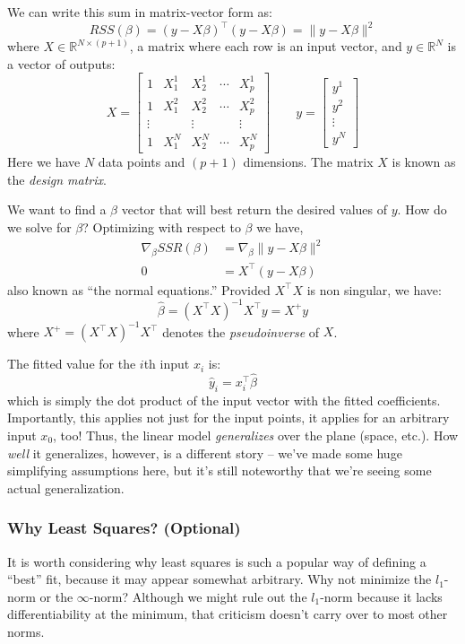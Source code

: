 \documentclass[a4paper]{article}
\begin{document}
We can write this sum in matrix-vector form as:
$$RSS(\beta) = (y-X\beta)^\top(y-X\beta) = \|y-X\beta\|^2$$
where $X\in\mathbb{R}^{N\times (p+1)}$, a matrix where each row is an input vector, and $y\in\mathbb{R}^N$ is a vector of outputs:
$$X=\left[\begin{array}{ccccc}1&X_1^1&X_2^1&\cdots&X_p^1\\1&X_1^2&X_2^2&\cdots&X_p^2\\\vdots& &\vdots& & \vdots\\1&X_1^N&X_2^N&\cdots&X_p^N\end{array}\right] \qquad y=\left[\begin{array}{c}y^1\\y^2\\\vdots\\y^N\end{array}\right]$$
Here we have $N$ data points and $(p+1)$ dimensions. The matrix $X$ is known as the \emph{design matrix}.

We want to find a $\beta$ vector that will best return the desired values of $y$.  How do we solve for $\beta$?  Optimizing with respect to $\beta$ we have,
\begin{align*}
\nabla_\beta SSR(\beta) &= \nabla_\beta \|y-X\beta\|^2\\
0 &= X^\top(y-X\beta)
\end{align*}
also known as ``the normal equations.''  Provided $X^\top X$ is non singular, we have:
$$\hat{\beta}=(X^\top X)^{-1}X^\top y = X^+y$$
where $X^+=(X^\top X)^{-1}X^\top$ denotes the \emph{pseudoinverse} of $X$.

The fitted value for the $i$th input $x_i$ is:
$$\hat{y}_i=x_i^\top \hat{\beta}$$
which is simply the dot product of the input vector with the fitted coefficients.  Importantly, this applies not just for the input points, it applies for an arbitrary input $x_0$, too!  Thus, the linear model \emph{generalizes} over the plane (space, etc.).  How \emph{well} it generalizes, however, is a different story -- we've made some huge simplifying assumptions here, but it's still noteworthy that we're seeing some actual generalization.

\subsubsection{Why Least Squares? (Optional)}

It is worth considering why least squares is such a popular way of defining a ``best'' fit, because it may appear somewhat arbitrary.  Why not minimize the $l_1$-norm or the $\infty$-norm?  Although we might rule out the $l_1$-norm because it lacks differentiability at the minimum, that criticism doesn't carry over to most other norms.
\end{document}
